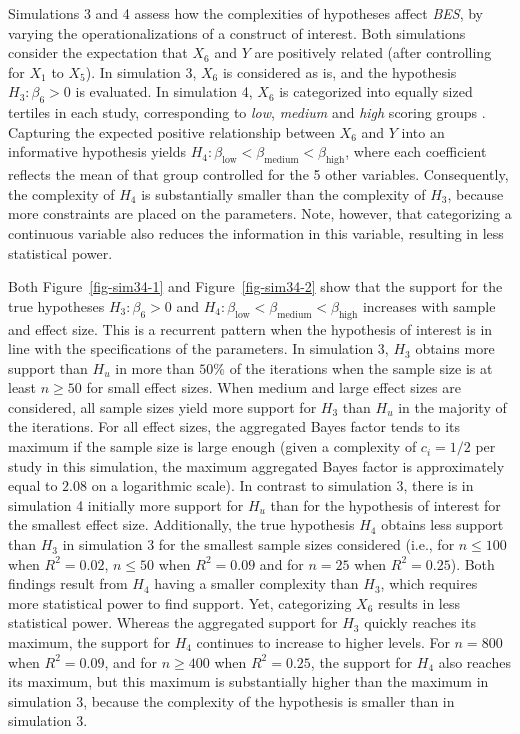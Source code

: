 \documentclass[
  authoryear,
  preprint,
  5p,
  twocolumn]{elsarticle}
\begin{document}
Simulations 3 and 4 assess how the complexities of hypotheses affect
\emph{BES}, by varying the operationalizations of a construct of
interest. Both simulations consider the expectation that \(X_6\) and
\(Y\) are positively related (after controlling for \(X_1\) to \(X_5\)).
In simulation 3, \(X_6\) is considered as is, and the hypothesis
\(H_3: \beta_6 > 0\) is evaluated. In simulation 4, \(X_6\) is
categorized into equally sized tertiles in each study, corresponding to
\emph{low}, \emph{medium} and \emph{high} scoring groups \citep[which
is, despite advice against it, a common procedure in many areas of
research; e.g.,][]{bennette_against_2012, decoster_best_2011}. Capturing
the expected positive relationship between \(X_6\) and \(Y\) into an
informative hypothesis yields
\(H_4: \beta_{\text{low}} < \beta_{\text{medium}} < \beta_{\text{high}}\),
where each coefficient reflects the mean of that group controlled for
the 5 other variables. Consequently, the complexity of \(H_4\) is
substantially smaller than the complexity of \(H_3\), because more
constraints are placed on the parameters. Note, however, that
categorizing a continuous variable also reduces the information in this
variable, resulting in less statistical power.

Both Figure~\ref{fig-sim34-1} and Figure~\ref{fig-sim34-2} show that the
support for the true hypotheses \(H_3:\beta_6>0\) and
\(H_4: \beta_{\text{low}} < \beta_{\text{medium}} < \beta_{\text{high}}\)
increases with sample and effect size. This is a recurrent pattern when
the hypothesis of interest is in line with the specifications of the
parameters. In simulation 3, \(H_3\) obtains more support than \(H_u\)
in more than \(50\%\) of the iterations when the sample size is at least
\(n \geq 50\) for small effect sizes. When medium and large effect sizes
are considered, all sample sizes yield more support for \(H_3\) than
\(H_u\) in the majority of the iterations. For all effect sizes, the
aggregated Bayes factor tends to its maximum if the sample size is large
enough (given a complexity of \(c_i = 1/2\) per study in this
simulation, the maximum aggregated Bayes factor is approximately equal
to \(2.08\) on a logarithmic scale). In contrast to simulation 3, there
is in simulation 4 initially more support for \(H_u\) than for the
hypothesis of interest for the smallest effect size. Additionally, the
true hypothesis \(H_4\) obtains less support than \(H_3\) in simulation
3 for the smallest sample sizes considered (i.e., for \(n \leq 100\)
when \(R^2 = 0.02\), \(n \leq 50\) when \(R^2 = 0.09\) and for
\(n = 25\) when \(R^2 = 0.25\)). Both findings result from \(H_4\)
having a smaller complexity than \(H_3\), which requires more
statistical power to find support. Yet, categorizing \(X_6\) results in
less statistical power. Whereas the aggregated support for \(H_3\)
quickly reaches its maximum, the support for \(H_4\) continues to
increase to higher levels. For \(n = 800\) when \(R^2 = 0.09\), and for
\(n \geq 400\) when \(R^2 = 0.25\), the support for \(H_4\) also reaches
its maximum, but this maximum is substantially higher than the maximum
in simulation 3, because the complexity of the hypothesis is smaller
than in simulation 3.
\end{document}

